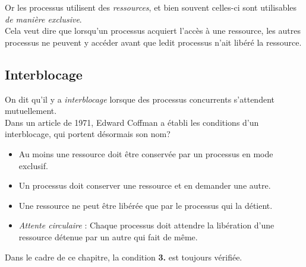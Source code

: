 \documentclass[10pt,firamath,cours]{nsi}
\begin{document}
Or les processus utilisent des \textit{ressources}, et bien souvent celles-ci sont utilisables \textit{de manière exclusive}.\\

Cela veut dire que lorsqu'un processus acquiert l'accès à une ressource, les autres processus ne peuvent y accéder avant que ledit processus n'ait libéré la ressource.

\subsection{Interblocage}
On dit qu'il y a \textit{interblocage} lorsque des processus concurrents s'attendent mutuellement.\\

Dans un article de 1971, Edward Coffman a établi les conditions d'un interblocage, qui portent désormais son nom?
\begin{propriete}
    \begin{itemize}
        \item 	Au moins une ressource doit être conservée par un processus en mode exclusif.
        \item 	Un processus doit conserver une ressource et en demander une autre.
        \item	Une ressource ne peut être libérée que par le processus qui la détient.
        \item 	\textit{Attente circulaire} : Chaque processus doit attendre la libération d'une ressource détenue par un autre qui fait de même.
    \end{itemize}        
\end{propriete}
Dans le cadre de ce chapitre, la condition \textbf{3.} est toujours vérifiée.
\end{document}
